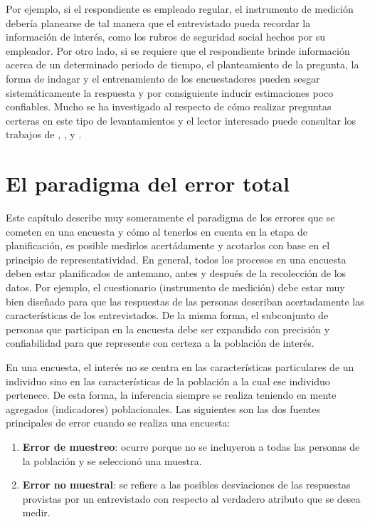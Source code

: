 \documentclass[
  12pt,
]{book}
\providecommand{\tightlist}{%
  \setlength{\itemsep}{0pt}\setlength{\parskip}{0pt}}
\begin{document}
Por ejemplo, si el respondiente es empleado regular, el instrumento de medición debería planearse de tal manera que el entrevistado pueda recordar la información de interés, como los rubros de seguridad social hechos por su empleador. Por otro lado, si se requiere que el respondiente brinde información acerca de un determinado periodo de tiempo, el planteamiento de la pregunta, la forma de indagar y el entrenamiento de los encuestadores pueden sesgar sistemáticamente la respuesta y por consiguiente inducir estimaciones poco confiables. Mucho se ha investigado al respecto de cómo realizar preguntas certeras en este tipo de levantamientos y el lector interesado puede consultar los trabajos de \citet{Biemer_Lyberg_2003}, \citet{Presser_Rothgeb_Couper_Lessler_Martin_Martin_Singer_2004}, y \citet{Groves_Fowler_Couper_Lepkowski_Singer_Tourangeau_2009}.

\hypertarget{el-paradigma-del-error-total}{%
\chapter{El paradigma del error total}\label{el-paradigma-del-error-total}}

Este capítulo describe muy someramente el paradigma de los errores que se cometen en una encuesta y cómo al tenerlos en cuenta en la etapa de planificación, es posible medirlos acertádamente y acotarlos con base en el principio de representatividad. En general, todos los procesos en una encuesta deben estar planificados de antemano, antes y después de la recolección de los datos. Por ejemplo, el cuestionario (instrumento de medición) debe estar muy bien diseñado para que las respuestas de las personas describan acertadamente las características de los entrevistados. De la misma forma, el subconjunto de personas que participan en la encuesta debe ser expandido con precisión y confiabilidad para que represente con certeza a la población de interés.

En una encuesta, el interés no se centra en las características particulares de un individuo sino en las características de la población a la cual ese individuo pertenece. De esta forma, la inferencia siempre se realiza teniendo en mente agregados (indicadores) poblacionales. Las siguientes son las dos fuentes principales de error cuando se realiza una encuesta:

\begin{enumerate}
\def\labelenumi{\arabic{enumi}.}
\tightlist
\item
  \textbf{Error de muestreo}: ocurre porque no se incluyeron a todas las personas de la población y se seleccionó una muestra.
\item
  \textbf{Error no muestral}: se refiere a las posibles desviaciones de las respuestas provistas por un entrevistado con respecto al verdadero atributo que se desea medir.
\end{enumerate}
\end{document}
